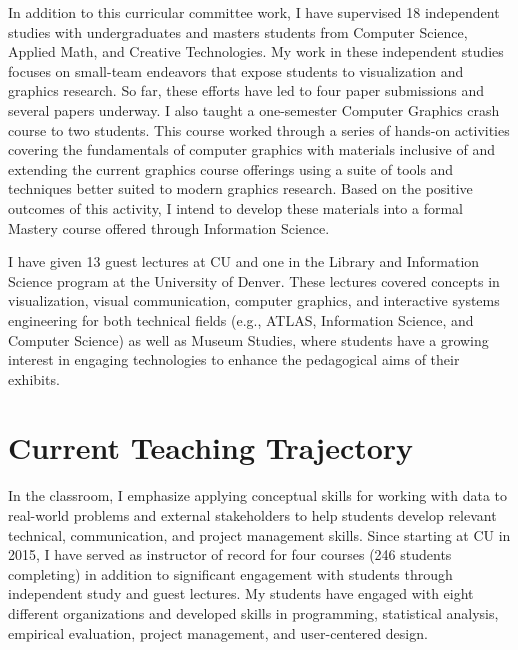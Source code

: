 \documentclass[11pt]{article}
\begin{document}
In addition to this curricular committee work, I have supervised 18 independent studies with undergraduates and masters students from Computer Science, Applied Math, and Creative Technologies. My work in these independent studies focuses on small-team endeavors that expose students to visualization and graphics research. So far, these efforts have led to four paper submissions and several papers underway. I also taught a one-semester Computer Graphics crash course to two students. This course worked through a series of hands-on activities covering the fundamentals of computer graphics with materials inclusive of and extending the current graphics course offerings using a suite of tools and techniques better suited to modern graphics research. Based on the positive outcomes of this activity, I intend to develop these materials into a formal Mastery course offered through Information Science. 



I have given 13 guest lectures at CU and one in the Library and Information Science program at the University of Denver. These lectures covered concepts in visualization, visual communication, computer graphics, and interactive systems engineering for both technical fields (e.g., ATLAS, Information Science, and Computer Science) as well as Museum Studies, where students have a growing interest in engaging technologies to enhance the pedagogical aims of their exhibits. 


\section*{Current Teaching Trajectory}

In the classroom, I emphasize applying conceptual skills for working with data to real-world problems and external stakeholders to help students develop relevant technical, communication, and project management skills. Since starting at CU in 2015, I have served as instructor of record for four courses (246 students completing) in addition to significant engagement with students through independent study and guest lectures. My students have engaged with eight different organizations and developed skills in programming, statistical analysis, empirical evaluation, project management, and user-centered design.
\end{document}
